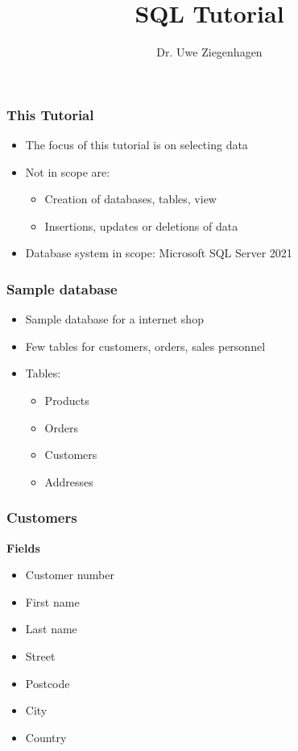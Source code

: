 \documentclass[aspectratio=169,ngerman]{beamer}
\author{Dr. Uwe Ziegenhagen}
\title{SQL Tutorial}
\begin{document}
\begin{frame}

\maketitle

\end{frame}

\begin{frame}
\frametitle{This Tutorial}

\begin{itemize}
\item The focus of this tutorial is on selecting data
\item Not in scope are:
\begin{itemize}
	\item Creation of databases, tables, view
	\item Insertions, updates or deletions of data
\end{itemize}
\item Database system in scope: Microsoft SQL Server 2021
\end{itemize}
\end{frame}


\begin{frame}
\frametitle{Sample database}

\begin{itemize}
	\item Sample database for a internet shop
	\item Few tables for customers, orders, sales personnel
	\item Tables:
	\begin{itemize}
		\item Products
		\item Orders
		\item Customers
		\item Addresses
		\end{itemize}
\end{itemize}

\end{frame}

\begin{frame}
\frametitle{Customers}

\textbf{Fields}

\begin{itemize}
\item Customer number
\item First name
\item Last name
\item Street 
\item Postcode
\item City
\item Country
\end{itemize}
\end{frame}
\end{document}
